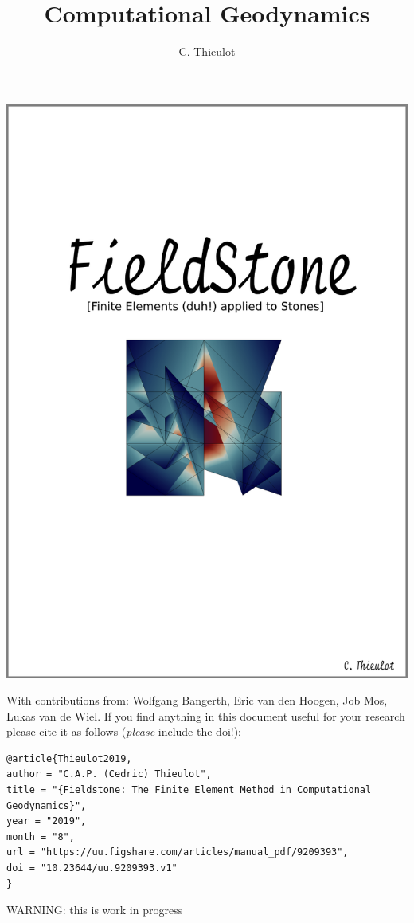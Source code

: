 \documentclass[a4paper]{article}
\title{Computational Geodynamics}
\author{C. Thieulot}
\begin{document}
\thispagestyle{empty}
\includegraphics[width=\linewidth]{images/frontpage.png}

With contributions from: Wolfgang Bangerth, Eric van den Hoogen, Job Mos, Lukas van de Wiel. 
\newpage
If you find anything in this document useful for your research please cite it 
as follows ({\it please} include the doi!):
\begin{verbatim}
@article{Thieulot2019,
author = "C.A.P. (Cedric) Thieulot",
title = "{Fieldstone: The Finite Element Method in Computational Geodynamics}",
year = "2019",
month = "8",
url = "https://uu.figshare.com/articles/manual_pdf/9209393",
doi = "10.23644/uu.9209393.v1"
}
\end{verbatim}
\newpage
\maketitle
\tableofcontents
\newpage
\begin{center}
{\color{red} \huge WARNING: this is work in progress}
\end{center}
\end{document}
